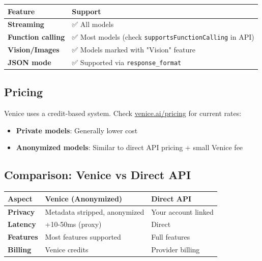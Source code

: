 \begin{table}[h]
\centering
\small
\begin{tabular}{|l|l|}
\hline
Feature & Support \\
\hline
\textbf{Streaming} & ✅ All models \\
\hline
\textbf{Function calling} & ✅ Most models (check \texttt{supportsFunctionCalling} in API) \\
\hline
\textbf{Vision/Images} & ✅ Models marked with "Vision" feature \\
\hline
\textbf{JSON mode} & ✅ Supported via \texttt{response\_format} \\
\hline
\end{tabular}
\end{table}



\subsection{Pricing}


Venice uses a credit-based system. Check \href{https://venice.ai/pricing}{venice.ai/pricing} for current rates:

\begin{itemize}
  \item \textbf{Private models}: Generally lower cost
  \item \textbf{Anonymized models}: Similar to direct API pricing + small Venice fee
\end{itemize}


\subsection{Comparison: Venice vs Direct API}



\begin{table}[h]
\centering
\small
\begin{tabular}{|l|l|l|}
\hline
Aspect & Venice (Anonymized) & Direct API \\
\hline
\textbf{Privacy} & Metadata stripped, anonymized & Your account linked \\
\hline
\textbf{Latency} & +10-50ms (proxy) & Direct \\
\hline
\textbf{Features} & Most features supported & Full features \\
\hline
\textbf{Billing} & Venice credits & Provider billing \\
\hline
\end{tabular}
\end{table}



